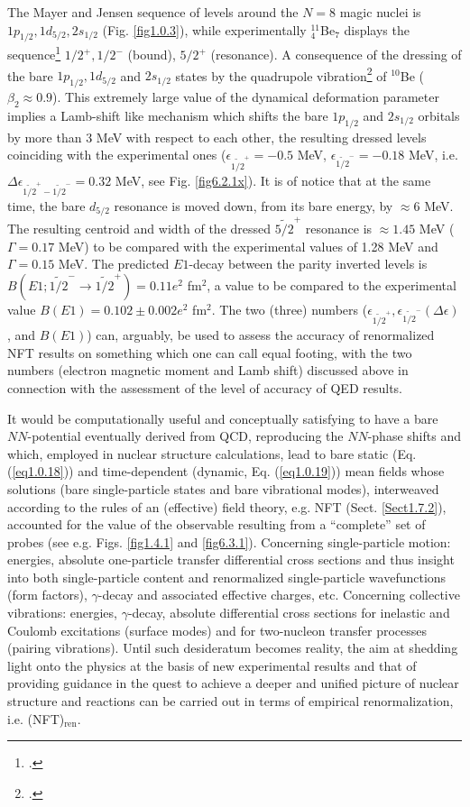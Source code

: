 The Mayer and Jensen sequence of levels around the  $N=8$ magic nuclei is $1p_{1/2},1d_{5/2},2s_{1/2}$ (Fig. \ref{fig1.0.3}), while experimentally $^{11}_{4}$Be$_{7}$ displays the sequence\footnote{\cite{Kwan:14}.} $1/2^+,1/2^-$ (bound), $5/2^+$ (resonance). A consequence of the dressing of the bare $1p_{1/2},1d_{5/2}$ and  $2s_{1/2}$ states by the quadrupole vibration\footnote{\cite{Barranco:17}.} of $^{10}$Be ($\beta_2\approx0.9$). This extremely
large value of the dynamical deformation parameter implies a Lamb-shift like mechanism which shifts the bare $1p_{1/2}$ and $2s_{1/2}$ orbitals by more than 3 MeV with respect to each other, the resulting dressed levels coinciding with the experimental ones ($\epsilon_{\widetilde {1/2}^+}=-0.5$ MeV, $\epsilon_{\widetilde {1/2}^-}=-0.18$ MeV, i.e. $\Delta\epsilon_{\widetilde {1/2}^+-\widetilde {1/2}^-}=0.32$ MeV, see Fig. \ref{fig6.2.1x}). It is of notice that at the same time, the bare $d_{5/2}$ resonance is moved down, from its bare energy, by $\approx6$ MeV. The resulting centroid and width of the dressed $\widetilde{5/2}^+$ resonance is $\approx1.45$ MeV ($\Gamma=0.17$ MeV) to be compared with the experimental values of 1.28 MeV and $\Gamma=0.15$ MeV. The predicted $E1$-decay between the parity inverted levels is $B(E1;\widetilde{1/2}^-\to\widetilde{1/2}^+)=0.11e^2$ fm$^2$, a value to be compared to the experimental value $B(E1)=0.102\pm0.002e^2$ fm$^2$. The two (three) numbers ($\epsilon_{\widetilde{1/2}^+},\epsilon_{\widetilde {1/2}^-} (\Delta\epsilon)$, and $B(E1)$) can, arguably, be used to assess the accuracy of renormalized NFT results on something which one can call equal footing, with the two numbers (electron magnetic moment and Lamb shift) discussed above in connection with the assessment of the level of accuracy of QED results. 


It would be computationally useful and conceptually satisfying to have a bare $NN$-potential eventually derived from QCD, reproducing the $NN$-phase shifts and which, employed in nuclear structure calculations, lead to bare static (Eq. (\ref{eq1.0.18})) and  time-dependent (dynamic, Eq. (\ref{eq1.0.19})) mean fields whose solutions (bare single-particle states and bare vibrational modes), interweaved according to the rules of an (effective) field theory, e.g. NFT (Sect. \ref{Sect1.7.2}), accounted for the value of the observable resulting from a ``complete'' set of probes (see e.g. Figs. \ref{fig1.4.1} and \ref{fig6.3.1}). Concerning single-particle motion: energies, absolute one-particle transfer differential cross sections and thus insight into both single-particle content and renormalized single-particle wavefunctions (form factors), $\gamma$-decay and associated effective charges, etc. Concerning collective vibrations: energies, $\gamma$-decay, absolute differential cross sections for inelastic and Coulomb excitations (surface modes) and for two-nucleon transfer processes (pairing vibrations).
Until such desideratum becomes reality, the aim at shedding light onto the physics at the basis of new experimental results and that of providing guidance in the quest to achieve a deeper and unified picture of nuclear structure and reactions can be carried out in terms of empirical renormalization, i.e. (NFT)$_{\text{ren}}$.  

